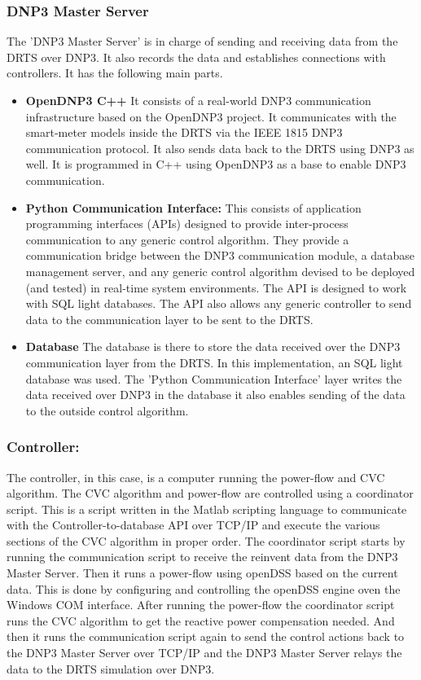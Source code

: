 \subsubsection{DNP3 Master Server}
The 'DNP3 Master Server' is in charge of sending and receiving data from the DRTS over DNP3. It also records the data and establishes connections with controllers.  It has the following main parts.
\begin{itemize}
    \item \textbf{OpenDNP3 C++} It consists of a real-world DNP3 communication infrastructure based on the OpenDNP3 \cite{opendnp3_2020} project. It communicates with the smart-meter models inside the DRTS via the IEEE 1815 DNP3 communication protocol. It also sends data back to the DRTS using DNP3 as well. It is programmed in C++ using OpenDNP3 as a base to enable DNP3 communication.
    \item \textbf{Python Communication Interface:} This consists of application programming interfaces (APIs) designed to provide inter-process communication to any generic control algorithm. They provide a communication bridge between the DNP3 communication module, a database management server, and any generic control algorithm devised to be deployed (and tested) in real-time system environments. The API is designed to work with SQL light databases. The API also allows any generic controller to send data to the communication layer to be sent to the DRTS.
    \item \textbf{Database} The database is there to store the data received over the DNP3 communication layer from the DRTS. In this implementation, an SQL light database was used. The 'Python Communication Interface' layer writes the data received over DNP3 in the database it also enables sending of the data to the outside control algorithm.
\end{itemize}

\subsubsection{Controller:}
The controller, in this case, is a computer running the power-flow and CVC algorithm. The CVC algorithm and power-flow are controlled using a coordinator script. This is a script written in the Matlab scripting language to communicate with the Controller-to-database API over TCP/IP and execute the various sections of the CVC algorithm in proper order. The coordinator script starts by running the communication script to receive the reinvent data from the DNP3 Master Server. Then it runs a power-flow using openDSS based on the current data. This is done by configuring and controlling the openDSS engine oven the Windows COM interface. After running the power-flow the coordinator script runs the CVC algorithm to get the reactive power compensation needed. And then it runs the communication script again to send the control actions back to the DNP3 Master Server over TCP/IP and the DNP3 Master Server relays the data to the DRTS simulation over DNP3.

